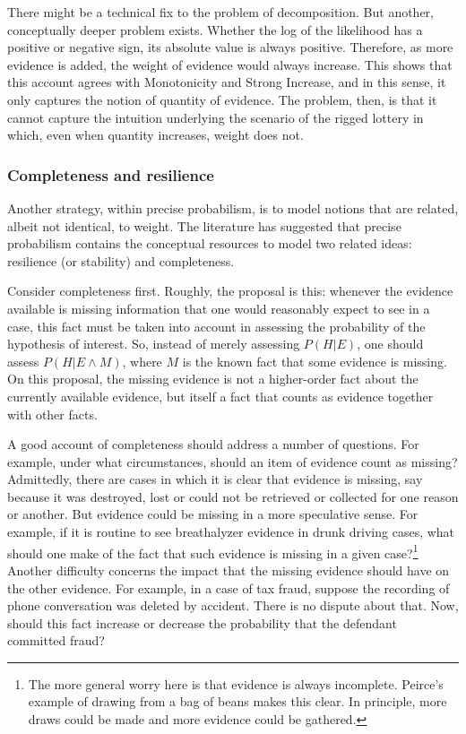 \documentclass[
  10pt,
  dvipsnames,enabledeprecatedfontcommands]{scrartcl}
\begin{document}
There might be a technical fix to the problem of decomposition. But
another, conceptually deeper problem exists. Whether the log of the
likelihood has a positive or negative sign, its absolute value is always
positive. Therefore, as more evidence is added, the weight of evidence
would always increase. This shows that this account agrees with
Monotonicity and Strong Increase, and in this sense, it only captures
the notion of quantity of evidence. The problem, then, is that it cannot
capture the intuition underlying the scenario of the rigged lottery in
which, even when quantity increases, weight does not.

\hypertarget{completeness-and-resilience}{%
\subsubsection{Completeness and
resilience}\label{completeness-and-resilience}}

Another strategy, within precise probabilism, is to model notions that
are related, albeit not identical, to weight. The literature has
suggested that precise probabilism contains the conceptual resources to
model two related ideas: resilience (or stability) and completeness.

Consider completeness first.  Roughly, the proposal is
this: whenever the evidence available is missing information that one
would reasonably expect to see in a case, this fact must be taken into
account in assessing the probability of the hypothesis of interest. So,
instead of merely assessing \(P(H \vert E)\), one should assess
\(P(H \vert E \wedge M)\), where \(M\) is the known fact that some
evidence is missing. On this proposal, the missing evidence is not a
higher-order fact about the currently available evidence, but itself a
fact that counts as evidence together with other facts.

A good account of completeness should address a number of questions. For
example, under what circumstances, should an item of evidence count as
missing? Admittedly, there are cases in which it is clear that evidence
is missing, say because it was destroyed, lost or could not be retrieved
or collected for one reason or another. But evidence could be missing in
a more speculative sense. For example, if it is routine to see
breathalyzer evidence in drunk driving cases, what should one make of
the fact that such evidence is missing in a given case?\footnote{The
  more general worry here is that evidence is always incomplete.
  Peirce's example of drawing from a bag of beans makes this clear. In
  principle, more draws could be made and more evidence could be
  gathered.} Another difficulty concerns the impact that the missing
evidence should have on the other evidence. For example, in a case of
tax fraud, suppose the recording of phone conversation was deleted by
accident. There is no dispute about that. Now, should this fact increase
or decrease the probability that the defendant committed fraud?
\end{document}
